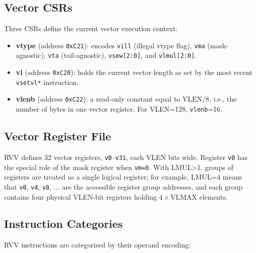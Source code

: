 \subsection{Vector CSRs}

Three CSRs define the current vector execution context:

\begin{itemize}
  \item \textbf{vtype} (address \texttt{0xC21}): encodes \texttt{vill} (illegal vtype
        flag), \texttt{vma} (mask-agnostic), \texttt{vta} (tail-agnostic),
        \texttt{vsew[2:0]}, and \texttt{vlmul[2:0]}.
  \item \textbf{vl} (address \texttt{0xC20}): holds the current vector length as set
        by the most recent \texttt{vsetvl*} instruction.
  \item \textbf{vlenb} (address \texttt{0xC22}): a read-only constant equal to
        $\text{VLEN}/8$, i.e., the number of bytes in one vector register.
        For VLEN=128, \texttt{vlenb}=16.
\end{itemize}

\subsection{Vector Register File}

RVV defines 32 vector registers, \texttt{v0}--\texttt{v31}, each VLEN bits wide.
Register \texttt{v0} has the special role of the mask register when \texttt{vm=0}.
With LMUL>1, groups of registers are treated as a single logical register; for example,
LMUL=4 means that \texttt{v0}, \texttt{v4}, \texttt{v8}, $\ldots$ are the accessible
register group addresses, and each group contains four physical VLEN-bit registers
holding $4 \times \text{VLMAX}$ elements.

\subsection{Instruction Categories}

RVV instructions are categorised by their operand encoding:

